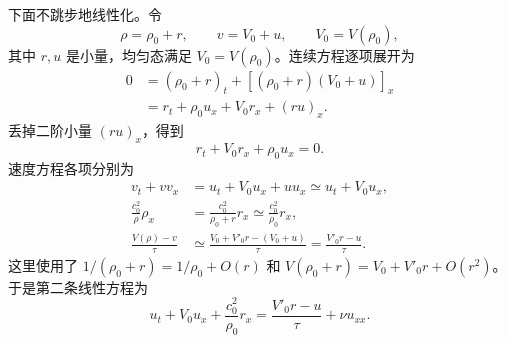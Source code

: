 \documentclass[11pt,a4paper,openany]{book}
\numberwithin{equation}{chapter}
\numberwithin{figure}{chapter}
\numberwithin{table}{chapter}
\begin{document}
下面不跳步地线性化。令
\begin{equation}
\rho=\rho_0+r,
\qquad v=V_0+u,
\qquad V_0=V(\rho_0),
\label{eq:pw-perturbation}
\end{equation}
其中 $r,u$ 是小量，均匀态满足 $V_0=V(\rho_0)$。连续方程逐项展开为
\begin{align}
0&=(\rho_0+r)_t+[(\rho_0+r)(V_0+u)]_x\\
 &=r_t+\rho_0u_x+V_0r_x+(ru)_x.
\end{align}
丢掉二阶小量 $(ru)_x$，得到
\begin{equation}
r_t+V_0r_x+\rho_0u_x=0.
\label{eq:pw-linear-continuity}
\end{equation}
速度方程各项分别为
\begin{align}
v_t+vv_x&=u_t+V_0u_x+uu_x
          \simeq u_t+V_0u_x,\\
\frac{c_0^2}{\rho}\rho_x
&=\frac{c_0^2}{\rho_0+r}r_x
 \simeq \frac{c_0^2}{\rho_0}r_x,\\
\frac{V(\rho)-v}{\tau}
&\simeq\frac{V_0+V'_0r-(V_0+u)}{\tau}
=\frac{V'_0r-u}{\tau}.
\end{align}
这里使用了 $1/(\rho_0+r)=1/\rho_0+O(r)$ 和 $V(\rho_0+r)=V_0+V'_0r+O(r^2)$。于是第二条线性方程为
\begin{equation}
u_t+V_0u_x+\frac{c_0^2}{\rho_0}r_x
=\frac{V'_0r-u}{\tau}+\nu u_{xx}.
\label{eq:pw-linear-speed}
\end{equation}
\end{document}
